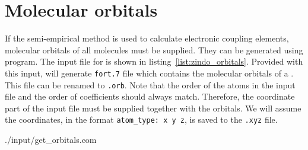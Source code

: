\section{Molecular orbitals}
If the semi-empirical method is used to calculate electronic coupling elements, molecular orbitals of all molecules must be supplied. They can be generated using \gaussian program. The \gaussian input file for \dcvt is shown in listing~\ref{list:zindo_orbitals}. Provided with this input, \gaussian will generate \texttt{fort.7} file which contains the molecular orbitals of a \dcvt. This file can be renamed to \texttt{\dcvt.orb}. Note that the order of the atoms in the input file and the order of coefficients should always match. Therefore, the coordinate part of the input file must be supplied together with the orbitals. We will assume the coordinates, in the format \texttt{atom\_type: x y z}, is saved to the \texttt{\dcvt.xyz} file.

%
{./input/get_orbitals.com}
%

